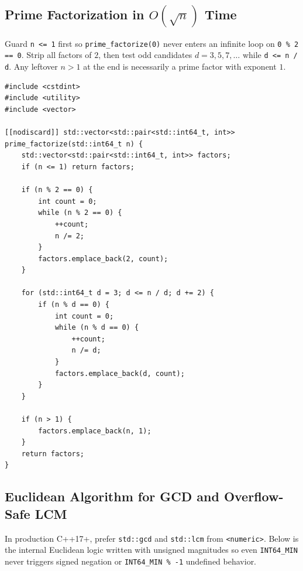 \documentclass[11pt,a4paper]{article}
\theoremstyle{definition}
\begin{document}
\subsection{Prime Factorization in \texorpdfstring{$O(\sqrt{n})$}{O(sqrt(n))} Time}

Guard \texttt{n <= 1} first so \texttt{prime\_factorize(0)} never enters an infinite loop on \texttt{0 \% 2 == 0}. Strip all factors of $2$, then test odd candidates $d = 3, 5, 7, \dots$ while \texttt{d <= n / d}. Any leftover $n > 1$ at the end is necessarily a prime factor with exponent $1$.

\begin{lstlisting}[caption={Overflow-Safe Prime Factorization in $O(\sqrt{n})$ Time}]
#include <cstdint>
#include <utility>
#include <vector>

[[nodiscard]] std::vector<std::pair<std::int64_t, int>> prime_factorize(std::int64_t n) {
    std::vector<std::pair<std::int64_t, int>> factors;
    if (n <= 1) return factors;

    if (n % 2 == 0) {
        int count = 0;
        while (n % 2 == 0) {
            ++count;
            n /= 2;
        }
        factors.emplace_back(2, count);
    }

    for (std::int64_t d = 3; d <= n / d; d += 2) {
        if (n % d == 0) {
            int count = 0;
            while (n % d == 0) {
                ++count;
                n /= d;
            }
            factors.emplace_back(d, count);
        }
    }

    if (n > 1) {
        factors.emplace_back(n, 1);
    }
    return factors;
}
\end{lstlisting}

\subsection{Euclidean Algorithm for GCD and Overflow-Safe LCM}

In production C++17+, prefer \texttt{std::gcd} and \texttt{std::lcm} from \texttt{<numeric>}. Below is the internal Euclidean logic written with unsigned magnitudes so even \texttt{INT64\_MIN} never triggers signed negation or \texttt{INT64\_MIN \% -1} undefined behavior.
\end{document}
